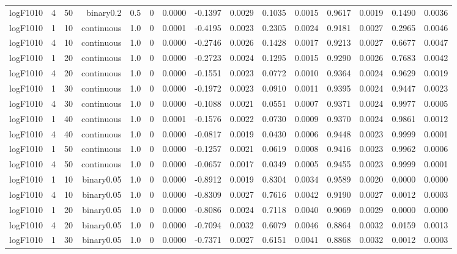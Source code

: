 \begin{longtable}{rrrrrrrrrrrrrrr}
  logF1010 & 4 & 50 & binary0.2 & 0.5 & 0 & 0.0000 & -0.1397 & 0.0029 & 0.1035 & 0.0015 & 0.9617 & 0.0019 & 0.1490 & 0.0036 \\ 
  logF1010 & 1 & 10 & continuous & 1.0 & 0 & 0.0001 & -0.4195 & 0.0023 & 0.2305 & 0.0024 & 0.9181 & 0.0027 & 0.2965 & 0.0046 \\ 
  logF1010 & 4 & 10 & continuous & 1.0 & 0 & 0.0000 & -0.2746 & 0.0026 & 0.1428 & 0.0017 & 0.9213 & 0.0027 & 0.6677 & 0.0047 \\ 
  logF1010 & 1 & 20 & continuous & 1.0 & 0 & 0.0000 & -0.2723 & 0.0024 & 0.1295 & 0.0015 & 0.9290 & 0.0026 & 0.7683 & 0.0042 \\ 
  logF1010 & 4 & 20 & continuous & 1.0 & 0 & 0.0000 & -0.1551 & 0.0023 & 0.0772 & 0.0010 & 0.9364 & 0.0024 & 0.9629 & 0.0019 \\ 
  logF1010 & 1 & 30 & continuous & 1.0 & 0 & 0.0000 & -0.1972 & 0.0023 & 0.0910 & 0.0011 & 0.9395 & 0.0024 & 0.9447 & 0.0023 \\ 
  logF1010 & 4 & 30 & continuous & 1.0 & 0 & 0.0000 & -0.1088 & 0.0021 & 0.0551 & 0.0007 & 0.9371 & 0.0024 & 0.9977 & 0.0005 \\ 
  logF1010 & 1 & 40 & continuous & 1.0 & 0 & 0.0001 & -0.1576 & 0.0022 & 0.0730 & 0.0009 & 0.9370 & 0.0024 & 0.9861 & 0.0012 \\ 
  logF1010 & 4 & 40 & continuous & 1.0 & 0 & 0.0000 & -0.0817 & 0.0019 & 0.0430 & 0.0006 & 0.9448 & 0.0023 & 0.9999 & 0.0001 \\ 
  logF1010 & 1 & 50 & continuous & 1.0 & 0 & 0.0000 & -0.1257 & 0.0021 & 0.0619 & 0.0008 & 0.9416 & 0.0023 & 0.9962 & 0.0006 \\ 
  logF1010 & 4 & 50 & continuous & 1.0 & 0 & 0.0000 & -0.0657 & 0.0017 & 0.0349 & 0.0005 & 0.9455 & 0.0023 & 0.9999 & 0.0001 \\ 
  logF1010 & 1 & 10 & binary0.05 & 1.0 & 0 & 0.0000 & -0.8912 & 0.0019 & 0.8304 & 0.0034 & 0.9589 & 0.0020 & 0.0000 & 0.0000 \\ 
  logF1010 & 4 & 10 & binary0.05 & 1.0 & 0 & 0.0000 & -0.8309 & 0.0027 & 0.7616 & 0.0042 & 0.9190 & 0.0027 & 0.0012 & 0.0003 \\ 
  logF1010 & 1 & 20 & binary0.05 & 1.0 & 0 & 0.0000 & -0.8086 & 0.0024 & 0.7118 & 0.0040 & 0.9069 & 0.0029 & 0.0000 & 0.0000 \\ 
  logF1010 & 4 & 20 & binary0.05 & 1.0 & 0 & 0.0000 & -0.7094 & 0.0032 & 0.6079 & 0.0046 & 0.8864 & 0.0032 & 0.0159 & 0.0013 \\ 
  logF1010 & 1 & 30 & binary0.05 & 1.0 & 0 & 0.0000 & -0.7371 & 0.0027 & 0.6151 & 0.0041 & 0.8868 & 0.0032 & 0.0012 & 0.0003 \\ 

\end{longtable}
